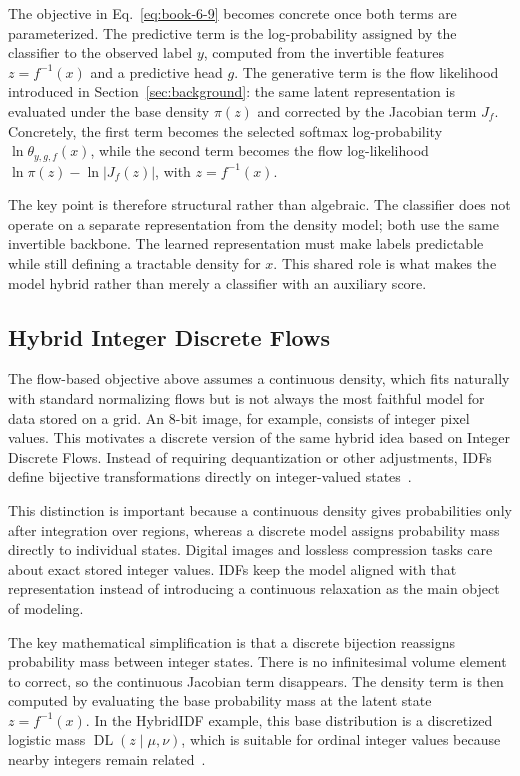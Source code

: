 \documentclass[runningheads]{llncs}
\begin{document}
The objective in Eq.~\eqref{eq:book-6-9} becomes concrete once both terms are
parameterized. The predictive term is the log-probability assigned by the
classifier to the observed label \(y\), computed from the invertible features
\(z=f^{-1}(x)\) and a predictive head \(g\). The generative term is the flow
likelihood introduced in Section~\ref{sec:background}: the same latent
representation is evaluated under the base density \(\pi(z)\) and corrected by
the Jacobian term \(J_f\). Concretely, the first term becomes the selected
softmax log-probability \(\ln \theta_{y,g,f}(x)\), while the second term becomes
the flow log-likelihood
\(\ln \pi(z)-\ln |J_f(z)|\), with \(z=f^{-1}(x)\).

The key point is therefore structural rather than algebraic. The classifier does
not operate on a separate representation from the density model; both use the
same invertible backbone. The learned representation must make labels
predictable while still defining a tractable density for \(x\). This shared role
is what makes the model hybrid rather than merely a classifier with an auxiliary
score.

\subsection{Hybrid Integer Discrete Flows}

The flow-based objective above assumes a continuous density, which fits naturally
with standard normalizing flows but is not always the most faithful model for
data stored on a grid. An 8-bit image, for example, consists of integer pixel
values. This motivates a discrete version of the same hybrid idea based on
Integer Discrete Flows. Instead of requiring dequantization or other adjustments,
IDFs define bijective transformations directly on integer-valued
states~\cite{hoogeboom2019integer}.

This distinction is important because a continuous density gives probabilities
only after integration over regions, whereas a discrete model assigns probability
mass directly to individual states. Digital images and lossless compression
tasks care about exact stored integer values. IDFs keep the model aligned with
that representation instead of introducing a continuous relaxation as the main
object of modeling.

The key mathematical simplification is that a discrete bijection reassigns
probability mass between integer states. There is no infinitesimal volume element
to correct, so the continuous Jacobian term disappears. The density term is then
computed by evaluating the base probability mass at the latent state
\(z=f^{-1}(x)\). In the HybridIDF example, this base distribution is a
discretized logistic mass \(\operatorname{DL}(z\mid\mu,\nu)\), which is suitable
for ordinal integer values because nearby integers remain
related~\cite{hoogeboom2019integer,tomczak2024deep}.
\end{document}

